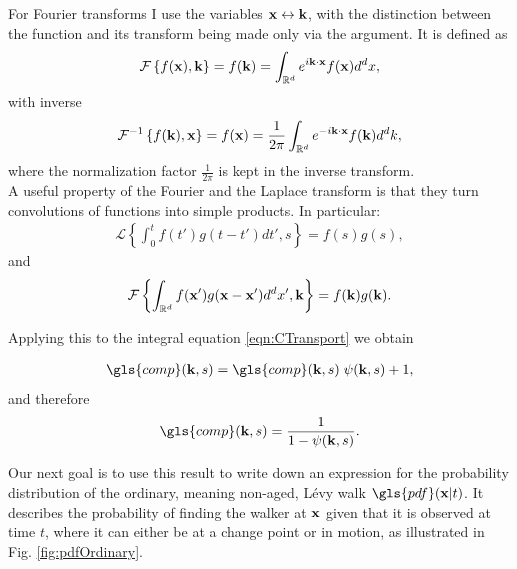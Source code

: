 For Fourier transforms I use the variables $\mathbf{ x } \leftrightarrow \mathbf{ k }$, with the distinction between the function and its transform being made only via the argument. It is defined as 
%
\begin{align}
\mathcal{F} \left\{ f(\mathbf{ x }), \mathbf{ k } \right\} = f(\mathbf{ k }) = \int_{\mathbb{R}^{d}} e^{i\mathbf{ k } \cdot \mathbf{ x }} f(\mathbf{ x }) d^{d}x ,
\end{align}
%
with inverse 
%
\begin{align}
\mathcal{F}^{-1} \left\{ f(\mathbf{ k }), \mathbf{ x } \right\} = f(\mathbf{ x }) = \frac{1}{2 \pi} \int_{\mathbb{R}^{d}} e^{-i\mathbf{ k } \cdot \mathbf{ x }} f(\mathbf{ k }) d^{d}k ,
\end{align}
%
where the normalization factor $\frac{1}{2 \pi}$ is kept in the inverse transform.\\

A useful property of the Fourier and the Laplace transform is that they turn convolutions of functions into simple products. In particular:
%
\begin{align}
\mathcal{L} \left\{ \int_{0}^{t} f(t') g(t-t') dt', s \right\} = f(s) g(s) , \label{eqn:LConvolution}
\end{align}
%
and 
%
\begin{align}
\mathcal{F} \left\{ \int_{\mathbb{R}^{d}} f(\mathbf{ x }') g(\mathbf{ x } - \mathbf{ x }') d^{d}x' , \mathbf{ k } \right\} = f(\mathbf{ k }) g(\mathbf{ k })  \label{eqn:FConvolution} .
\end{align}

Applying this to the integral equation \ref{eqn:CTransport} we obtain 

\begin{align}
\gls{comp}(\ve{k},s) =  \gls{comp}(\ve{k},s)  \; \psi(\ve{k},s) + 1 ,
\end{align}
%
and therefore 
%
\begin{align}
\gls{comp}(\ve{k},s) = \frac{1}{1 - \psi(\ve{k},s)} \label{eqn:CFourierLaplace} .
\end{align}

Our next goal is to use this result to write down an expression for the probability distribution of the ordinary, meaning non-aged, L\'evy walk $\gls{pdf}(\ve{x}|t)$. It describes the probability of finding the walker at $\mathbf{ x }$ given that it is observed at time $t$, where it can either be at a change point or in motion, as illustrated in Fig. \ref{fig:pdfOrdinary}. 

